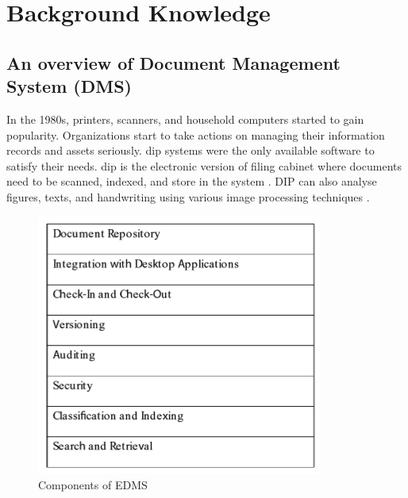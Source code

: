 \chapter{Background Knowledge}

\section{An overview of Document Management System (DMS)}
In the 1980s, printers, scanners, and household computers started to gain popularity.
Organizations start to take actions on managing their information records and assets seriously.
\gls{dip} systems were the only available software to satisfy their needs.
\gls{dip} is the electronic version of filing cabinet where documents need to be scanned, indexed, and store in the system \cite{1_adam_2008}.
DIP can also analyse figures, texts, and handwriting using various image processing techniques \cite{akram2010document}.
\begin{figure}
	\centering
	\includegraphics{res/bg-knowledge/edms-components.png}
	\caption{Components of EDMS }
	\label{fig:edms-components}
\end{figure}

